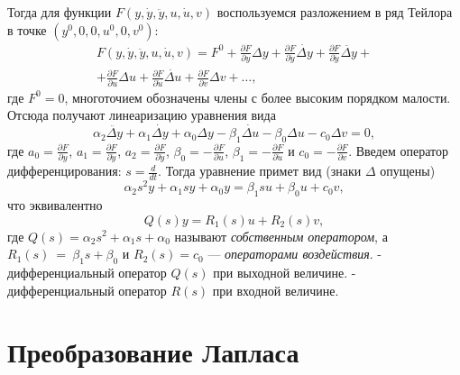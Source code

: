 \documentclass[../../TAU.tex]{subfiles}
\begin{document}
    Тогда для функции
    $F(y,\dot y, \ddot y, u, \dot u, v)$ 
    воспользуемся разложением в ряд Тейлора в точке 
    $(y^0, 0,0, u^0, 0, v^0)$:
    \begin{multline}
        F(y,\dot y, \ddot y, u, \dot u, v) = F^0 + \frac{\partial F}{\partial y} \Delta y +\frac{\partial F}{\partial \dot y} \dot{\Delta y}+ \frac{\partial F}{\partial \ddot y} \ddot{\Delta y} +\\  + \frac{\partial F}{\partial u} \Delta u + \frac{\partial F}{\partial \dot u } \dot{\Delta u} + \frac{\partial F}{\partial v} \Delta v + \ldots,
    \end{multline}
    где ${F^0= 0}$, многоточием обозначены члены с более высоким порядком малости.
    Отсюда получают линеаризацию уравнения 
    вида
    \begin{equation}\label{EQ_LINEAR}
        \alpha_2\ddot{\Delta y} + \alpha_1 \dot{\Delta y} + \alpha_0 \Delta y - \beta_1\dot{\Delta u} - \beta_0\Delta u - c_0 \Delta v = 0,
    \end{equation}
    где 
    ${a_0 = \frac{\partial F}{\partial y}}$, 
    ${a_1 = \frac{\partial F}{\partial \dot y}}$, ${a_2 = \frac{\partial F}{\partial \ddot y}}$, 
    ${\beta_0 = -\frac{\partial F}{\partial u}}$, 
    ${\beta_1 = -\frac{\partial F}{\partial \dot u }}$ и 
    ${c_0 = -\frac{\partial F}{\partial v}}$.
    Введем оператор дифференцирования: 
    ${s = \frac{d}{dt}}$.
    Тогда уравнение 
     примет вид (знаки $\Delta$ опущены)
    \begin{equation}
        \alpha_2 s^2 y + \alpha_1 s y + \alpha_0 y = \beta_1 s u + \beta_0 u + c_0 v,
    \end{equation}
    что эквивалентно
    \begin{equation}
        Q(s) y = R_1(s)u + R_2(s)v,
    \end{equation}
    где 
    ${Q(s) = \alpha_2s^2 + \alpha_1 s + \alpha_0}$ 
    называют {\it собственным оператором}, а 
    ${R_1(s)~=~\beta_1s+\beta_0}$ и 
    ${R_2(s) = c_0}$
     --- {\it операторами воздействия}.
     - дифференциальный оператор $Q(s)$ при выходной величине.
     - дифференциальный оператор $R(s)$ при входной величине.
    
\section{Преобразование Лапласа}
\end{document}
